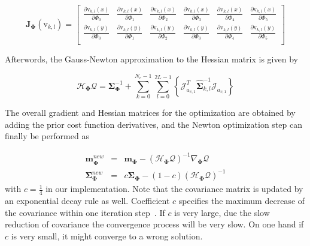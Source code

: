 \begin{equation}
  \label{eq:5.30}
\mathbf{J}_{\mathbf{\Phi}}(\mathrm{v}_{k,l}) =
\left[ {\begin{array}{cccccc}
\frac{\partial \mathrm{v}_{k,l}(x)}{\partial \Phi_0}& \frac{\partial \mathrm{v}_{k,l}(x)}{\partial \Phi_1}& \frac{\partial \mathrm{v}_{k,l}(x)}{\partial \Phi_2}& \frac{\partial \mathrm{v}_{k,l}(x)}{\partial \Phi_3}&\frac{\partial \mathrm{v}_{k,l}(x)}{\partial \Phi_4} &\frac{\partial \mathrm{v}_{k,l}(x)}{\partial \Phi_5}  \\
\frac{\partial \mathrm{v}_{k,l}(y)}{\partial \Phi_0}& \frac{\partial \mathrm{v}_{k,l}(y)}{\partial \Phi_1}& \frac{\partial \mathrm{v}_{k,l}(y)}{\partial \Phi_2}& \frac{\partial \mathrm{v}_{k,l}(y)}{\partial \Phi_3}&\frac{\partial \mathrm{v}_{k,l}(y)}{\partial \Phi_4} &\frac{\partial \mathrm{v}_{k,l}(y)}{\partial \Phi_5}  \\
 \end{array} } \right]
\end{equation}

Afterwords, the Gauss-Newton approximation to the Hessian
matrix is given by

\begin{equation}
  \label{eq:5.31}
  \mathcal{H}_{\mathbf{\Phi}} \mathcal{Q}  =
  \mathbf{\Sigma}_{\mathbf{\Phi}}^{-1} + \sum_{k = 0}^{N_{c}-1}
  \sum_{l=0}^{2L-1} \left\{\mathcal{J}_{a_{v,1}}^T\hat{\mathbf{\Sigma}}_{k,l}^{-1}\mathcal{J}_{a_{v,1}}\right\}
\end{equation}


The overall gradient and Hessian matrices for the optimization
are obtained by adding the prior cost function
derivatives, and the Newton optimization step can finally be
performed as

\begin{eqnarray}
  \mathbf{m}_{\mathbf{\Phi}}^{new} & = &
  \mathbf{m}_{\mathbf{\Phi}} - (\mathcal{H}_{\mathbf{\Phi}}
  \mathcal{Q})^{-1} \nabla_{\mathbf{\Phi}} \mathcal{Q} \nonumber \\
  \mathbf{\Sigma}_{\mathbf{\Phi}}^{new} & = &
  c\mathbf{\Sigma}_{\mathbf{\Phi}} - (1-c)(\mathcal{H}_{\mathbf{\Phi}}
  \mathcal{Q})^{-1}
\end{eqnarray}
with $c = \frac{1}{4}$ in our implementation. Note that the covariance
matrix is updated by an exponential decay rule as well. Coefficient $c$ specifies the
maximum decrease of the covariance within one iteration step~\cite{hanek2004contracting}. If $c$ is very large, due the slow reduction of covariance the
convergence process will be very slow. On one hand if $c$ is
very small, it might converge to a wrong solution.

